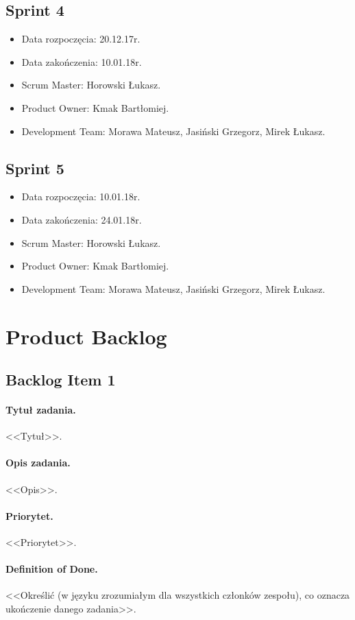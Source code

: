 \documentclass[a4paper]{article}
\begin{document}
\subsection{Sprint 4}

\begin{itemize}
\item Data rozpoczęcia: 20.12.17r.
\item  Data zakończenia: 10.01.18r.
\item Scrum Master: Horowski Łukasz.
\item Product Owner: Kmak Bartłomiej.
\item Development Team: Morawa Mateusz, Jasiński Grzegorz, Mirek Łukasz.
\end{itemize}

\subsection{Sprint 5}

\begin{itemize}
\item Data rozpoczęcia: 10.01.18r.
\item  Data zakończenia: 24.01.18r.
\item Scrum Master: Horowski Łukasz.
\item Product Owner: Kmak Bartłomiej.
\item Development Team: Morawa Mateusz, Jasiński Grzegorz, Mirek Łukasz.
\end{itemize}


\section{Product Backlog}

\subsection{Backlog Item 1}
\paragraph{Tytuł zadania.} <<Tytuł>>.
\paragraph{Opis zadania.} <<Opis>>.
\paragraph{Priorytet.} <<Priorytet>>.
\paragraph{Definition of Done.} <<Określić (w języku zrozumiałym dla wszystkich członków zespołu), co oznacza ukończenie danego zadania>>.
\end{document}
